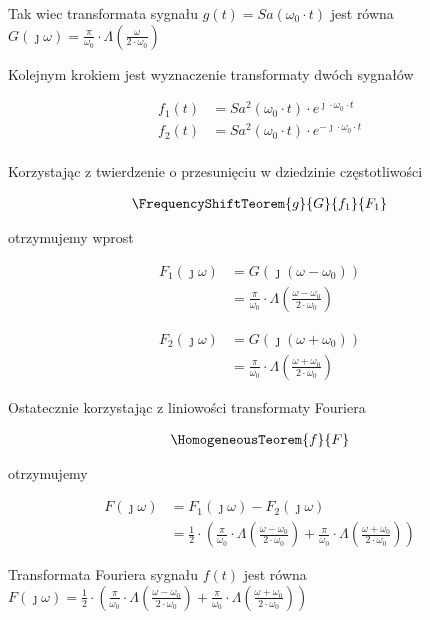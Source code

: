 \begin{task}
Tak wiec transformata sygnału $g(t)=Sa\left(\omega_0 \cdot t\right)$ jest równa $G(\jmath \omega)=\frac{\pi}{ \omega_0 } \cdot \Lambda\left( \frac{\omega}{2\cdot \omega_0}\right)$

Kolejnym krokiem jest wyznaczenie transformaty dwóch sygnałów

\begin{align*}
f_1(t)&=Sa^2\left(\omega_0 \cdot t\right) \cdot e^{\jmath \cdot \omega_0 \cdot t}\\
f_2(t)&=Sa^2\left(\omega_0 \cdot t\right) \cdot e^{-\jmath \cdot \omega_0 \cdot t}\\
\end{align*}

Korzystając z twierdzenie o przesunięciu w dziedzinie częstotliwości

\begin{align*}
\FrequencyShiftTeorem{g}{G}{f_1}{F_1}
\end{align*}

otrzymujemy wprost

\begin{align*}
F_1(\jmath \omega)&=G\left(\jmath \left(\omega -\omega_0\right)\right)\\
&=\frac{\pi}{ \omega_0 } \cdot \Lambda\left( \frac{\omega - \omega_0}{2\cdot \omega_0}\right)
\end{align*}

\begin{align*}
F_2(\jmath \omega)&=G\left(\jmath \left(\omega +\omega_0\right)\right)\\
&=\frac{\pi}{ \omega_0 } \cdot \Lambda\left( \frac{\omega + \omega_0}{2\cdot \omega_0}\right)
\end{align*}

Ostatecznie korzystając z liniowości transformaty Fouriera

\begin{align*}
\HomogeneousTeorem{f}{F}
\end{align*}

otrzymujemy

\begin{align*}
F(\jmath \omega)&=F_1(\jmath \omega)-F_2(\jmath \omega)\\
&=\frac{1}{2} \cdot \left( \frac{\pi}{ \omega_0 } \cdot \Lambda\left( \frac{\omega - \omega_0}{2\cdot \omega_0}\right) + \frac{\pi}{ \omega_0 } \cdot \Lambda\left( \frac{\omega + \omega_0}{2\cdot \omega_0}\right) \right)
\end{align*}


Transformata Fouriera sygnału $f(t)$ jest równa $F(\jmath \omega)=\frac{1}{2 } \cdot \left( \frac{\pi}{ \omega_0 } \cdot \Lambda\left( \frac{\omega - \omega_0}{2\cdot \omega_0}\right) + \frac{\pi}{ \omega_0 } \cdot \Lambda\left( \frac{\omega + \omega_0}{2\cdot \omega_0}\right) \right)$

\end{task}

